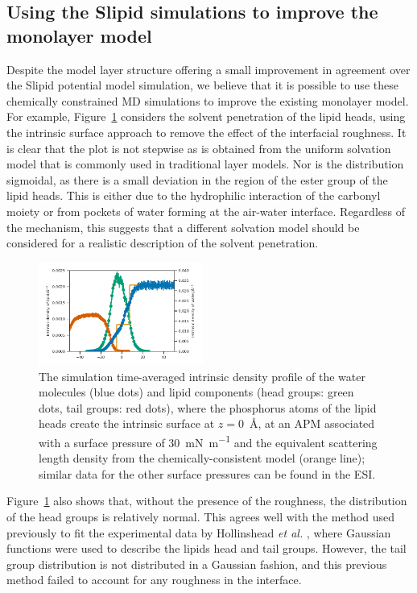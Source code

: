 \documentclass[amsmath,amssymb,twocolumn,superscriptaddress]{revtex4-1}
\begin{document}
\subsection{Using the Slipid simulations to improve the monolayer model}
Despite the model layer structure offering a small improvement in agreement over the Slipid potential model simulation, we believe that it is possible to use these chemically constrained MD simulations to improve the existing monolayer model.
For example, Figure~\ref{fig:waters} considers the solvent penetration of the lipid heads, using the intrinsic surface approach to remove the effect of the interfacial roughness.
It is clear that the plot is not stepwise as is obtained from the uniform solvation model that is commonly used in traditional layer models.
Nor is the distribution sigmoidal, as there is a small deviation in the region of the ester group of the lipid heads.
This is either due to the hydrophilic interaction of the carbonyl moiety or from pockets of water forming at the air-water interface.
Regardless of the mechanism, this suggests that a different solvation model should be considered for a realistic description of the solvent penetration.
%
\begin{figure}
\centering
  \includegraphics[width=0.48\textwidth]{water_30}
  \caption{The simulation time-averaged intrinsic density profile of the water molecules (blue dots) and lipid components (head groups: green dots, tail groups: red dots), where the phosphorus atoms of the lipid heads create the intrinsic surface at $z=$\SI{0}{\angstrom}, at an APM associated with a surface pressure of \SI{30}{\milli\newton\per\meter} and the equivalent scattering length density from the chemically-consistent model (orange line); similar data for the other surface pressures can be found in the ESI.}
  \label{fig:waters}
\end{figure}
%

Figure~\ref{fig:waters} also shows that, without the presence of the roughness, the distribution of the head groups is relatively normal.
This agrees well with the method used previously to fit the experimental data by Hollinshead \emph{et al.} \cite{hollinshead_effects_2009}, where Gaussian functions were used to describe the lipids head and tail groups.
However, the tail group distribution is not distributed in a Gaussian fashion, and this previous method failed to account for any roughness in the interface.
\end{document}
